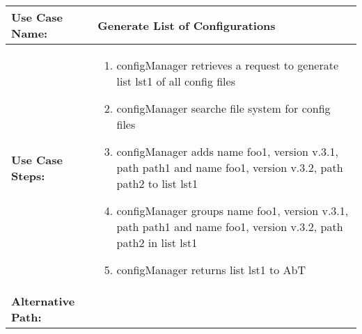 
\begin{tabularx}{\linewidth}{|l|X|}
\hline
\textbf{Use Case Name:} & \textbf{Generate List of Configurations} \\
\hline
\textbf{Use Case Steps:} & 
\begin{minipage}{\linewidth} 
  \vspace{0.05em}
  \begin{enumerate}
	\item configManager retrieves a request to generate list lst1 of all config files
	\item configManager searche file system for config files
	\item configManager adds name foo1, version v.3.1, path path1 and name foo1, version v.3.2, path path2 to list lst1
	\item configManager groups name foo1, version v.3.1, path path1 and name foo1, version v.3.2, path path2 in list lst1
	\item configManager returns list lst1 to AbT 
  \end{enumerate}
  \vspace{0.05em}
\end{minipage}
\\
\hline 
\textbf{Alternative Path:} &
\begin{minipage}{\linewidth}
  \vspace{0.05em} 
  \vspace{0.05em} 
\end{minipage}
\\
\hline
\end{tabularx}


